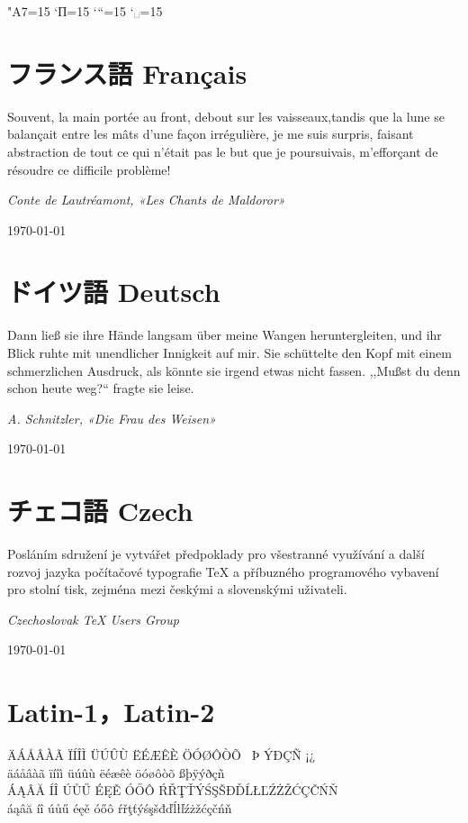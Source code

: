 \documentclass{ujarticle}
\begin{document}
\kcatcode"A7=15%
\kcatcode`П=15%
\kcatcode`“=15%
\kcatcode`␣=15%

\section{フランス語 Français}
Souvent, la main portée au front, debout sur les 
vaisseaux,tandis que la lune se balançait entre 
les mâts d'une façon irrégulière, je me suis surpris, 
faisant abstraction de tout ce qui n'était pas le but 
que je poursuivais, m'efforçant de résoudre ce 
difficile problème!

\hfill {\em Conte de Lautréamont, «Les Chants de Maldoror»}%
\qquad\qquad

\hfill\today


\section{ドイツ語 Deutsch}
Dann ließ sie ihre Hände langsam über meine Wangen
heruntergleiten, und ihr Blick ruhte mit unendlicher
Innigkeit auf mir.
Sie schüttelte den Kopf mit einem schmerzlichen Ausdruck,
als könnte sie irgend etwas nicht fassen.
,,Mußst du denn schon heute weg?{}`` 
fragte sie leise.

\hfill {\em A. Schnitzler, «Die Frau des Weisen»}%
\qquad\qquad

\hfill\today


%
\section{チェコ語 Czech}
Posláním sdružení je vytvářet předpoklady 
pro všestranné využívání a další rozvoj jazyka 
počítačové typografie \TeX{} a příbuzného programového 
vybavení pro stolní tisk, 
zejména mezi českými a slovenskými uživateli.

\hfill {\em Czechoslovak \TeX{} Users Group}%
\qquad\qquad

\hfill\today


\section{Latin-1，Latin-2}
ÄÁÅÂÀÃ ÏÍÎÌ ÜÚÛÙ ËÉÆÊÈ ÖÓØÔÒÕ ~Þ ÝÐÇÑ ¡¿\\
äáåâàã ïíîì üúûù ëéæêè öóøôòõ ßþÿýðçñ\\
ÁĄÂĂ ÍÎ Ú{Ů}Ű ÉĘĚ ÓŐÔ 
ŔŘŢŤÝŚŞŠĐĎĹŁĽŹŻŽĆÇČŃŇ\\
áąâă íî ú{ů}ű éęě óőô 
ŕřţťýśşšđďĺłľźżžćçčńň
\end{document}
